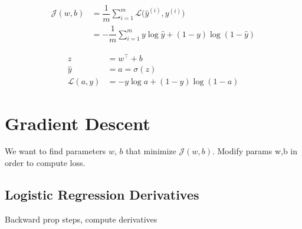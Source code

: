 \documentclass[12pt,reqno]{book}      %
\def\J{\mathscr{J}}
\def\L{\mathscr{L}}
\begin{document}
\begin{align}
\mathscr{J}(w,b) &= \dfrac{1}{m} \sum_{i = 1}^{m} \mathscr{L} \big( \hat{y}^{(i)}, y^{(i)} \big) \\
&= - \dfrac{1}{m} \sum_{i = 1}^{m} y \log \hat{y} + (1 - y) \log  (1 - \hat{y})
\end{align}

\begin{align}
z &= w^\intercal + b \\
\hat{y} &= a = \sigma(z) \\
\L(a,y) &= - y \log a + (1 - y) \log (1 - a)
\end{align}

\section{Gradient Descent}
We want to find parameters $w$, $b$ that minimize $\J(w,b)$. Modify params w,b in order to compute loss.


\subsection{Logistic Regression Derivatives}
Backward prop steps, compute derivatives
\end{document}
